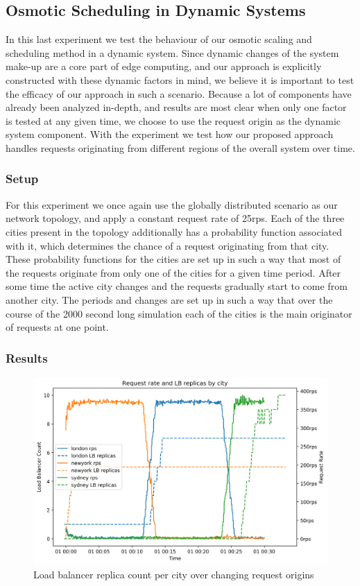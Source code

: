 \subsection{Osmotic Scheduling in Dynamic Systems}
In this last experiment we test the behaviour of our osmotic scaling and scheduling method in a dynamic system.
Since dynamic changes of the system make-up are a core part of edge computing, and our approach is explicitly constructed with these dynamic factors in mind, we believe it is important to test the efficacy of our approach in such a scenario.
Because a lot of components have already been analyzed in-depth, and results are most clear when only one factor is tested at any given time, we choose to use the request origin as the dynamic  system component.
With the experiment we test how our proposed approach handles requests originating from different regions of the overall system over time.
\subsubsection{Setup}
For this experiment we once again use the globally distributed scenario as our network topology, and apply a constant request rate of 25\gls{rps}.
Each of the three cities present in the topology additionally has a probability function associated with it, which determines the chance of a request originating from that city.
These probability functions for the cities are set up in such a way that most of the requests originate from only one of the cities for a given time period.
After some time the active city changes and the requests gradually start to come from another city.
The periods and changes are set up in such a way that over the course of the 2000 second long simulation each of the cities is the main originator of requests at one point.

\subsubsection{Results}

\begin{figure}
    \centering
    \includegraphics[width=14cm]{graphics/graphs/osmotic_dynamic_region_rps_lb_relicas.png}
    \caption{Load balancer replica count per city over changing request origins}
    \label{fig:osmotic_dynamic_lb_replicas}
\end{figure}

